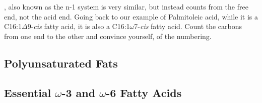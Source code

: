 \documentclass{tufte-handout}
\begin{document}
, also known as the n-1 system is very similar, but instead counts from the free end, not the acid end.  Going back to our example of Palmitoleic acid, while it is a C16:1$\Delta$9-\textit{cis} fatty acid, it is also a C16:1$\omega$7-\textit{cis} fatty acid.  Count the carbons from one end to the other and convince yourself, of the numbering.

\subsection{Polyunsaturated Fats}

\subsection{Essential $\omega$-3  and $\omega$-6 Fatty Acids}




\end{document}
